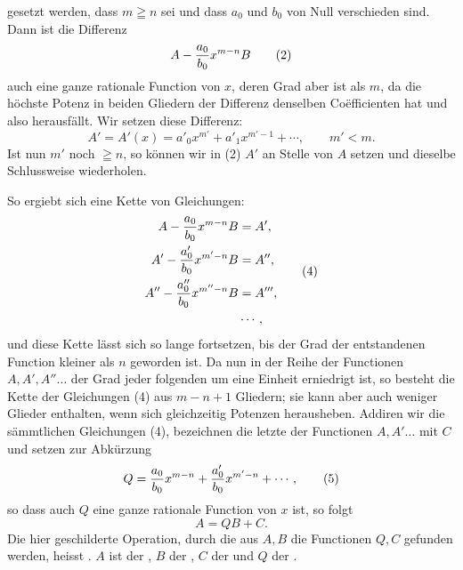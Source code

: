 \begingroup
\setlength{\abovedisplayskip}{5pt plus 2pt minus 1pt}
\setlength{\belowdisplayskip}{5pt plus 2pt minus 1pt}
\setlength{\abovedisplayshortskip}{3pt plus 1pt}
\setlength{\belowdisplayshortskip}{4pt plus 1pt}
\linespread{0.94}\selectfont
gesetzt werden, dass $m\geqq n$ sei und dass $a_0$ und $b_0$ von Null
verschieden sind. Dann ist die Differenz
\begin{equation}
 A-{a_0\over b_0}x^{m-n}B
\tag{2}
\end{equation}
auch eine ganze rationale Function von $x$, deren Grad aber
 ist als $m$, da die höchste Potenz in beiden Gliedern
der Differenz denselben Coëfficienten hat und also herausfällt.
Wir setzen diese Differenz:
\begin{equation}
 A'=A'(x)=a'_0x^{m'}+a'_1x^{m'-1}+\cdots,
 \qquad m'<m.
\tag{3}
\end{equation}
Ist nun $m'$ noch $\geqq n$, so können wir in (2) $A'$ an Stelle von
$A$ setzen und dieselbe Schlussweise wiederholen.

So ergiebt sich eine Kette von Gleichungen:
\begin{equation}
\begin{aligned}
 A-{a_0\over b_0}x^{m-n}B&=A',\\
 A'-{a'_0\over b_0}x^{m'-n}B&=A'',\\
 A''-{a''_0\over b_0}x^{m''-n}B&=A''',\\
 &\cdots,
\end{aligned}
\tag{4}
\end{equation}
und diese Kette lässt sich so lange fortsetzen, bis der Grad der
entstandenen Function kleiner als $n$ geworden ist. Da nun in der
Reihe der Functionen $A,A',A''\ldots$ der Grad jeder folgenden
 um eine Einheit erniedrigt ist, so besteht die
Kette der Gleichungen (4)  aus $m-n+1$ Gliedern;
sie kann aber auch weniger Glieder enthalten, wenn sich gleichzeitig
 Potenzen herausheben. Addiren wir die sämmtlichen
Gleichungen (4), bezeichnen die letzte der Functionen $A,A'\ldots$ mit
$C$ und setzen zur Abkürzung
\begin{equation}
 Q={a_0\over b_0}x^{m-n}+{a'_0\over b_0}x^{m'-n}+\cdots,
\tag{5}
\end{equation}
so dass auch $Q$ eine ganze rationale Function von $x$ ist, so folgt
\begin{equation}
 A=QB+C.
\tag{6}
\end{equation}
Die hier geschilderte Operation, durch die aus $A,B$ die Functionen
$Q,C$ gefunden werden, heisst . $A$ ist der
, $B$ der , $C$ der
 und $Q$ der . 
\endgroup
